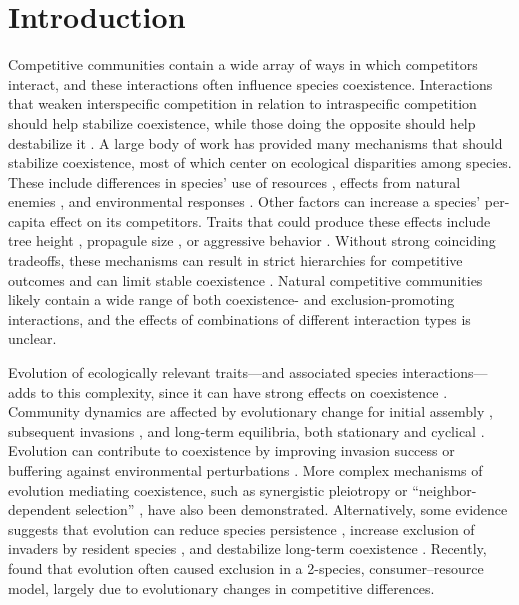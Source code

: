 
\section*{Introduction}

Competitive communities contain a wide array of ways in which
competitors interact, and these interactions often influence
species coexistence.
Interactions that weaken interspecific competition in relation to
intraspecific competition should help stabilize coexistence,
while those doing the opposite should help destabilize it 
\citep{Chesson2000}.
A large body of work has provided many mechanisms that should stabilize
coexistence, most of which center on ecological disparities among species.
These include differences in species'
use of resources \citep{Macarthur1967a,Roughgarden1976,Abrams2009}, 
effects from natural enemies \citep{Grover1998,Vandermeer1998,Ehrlich2017a,Abrams2002},
and environmental responses
\citep{Chesson1997,Armstrong1976,Loreau1992,Chesson1994,Kremer2017,Pacala1994}.
Other factors can increase a species' per-capita effect on its competitors.
Traits that could produce these effects include
tree height \citep{Falster2003}, 
propagule size \citep{Geritz1999,Fagerstrdm2016},
or aggressive behavior \citep{Brown1971}.
Without strong coinciding tradeoffs, these mechanisms can result 
in strict hierarchies for competitive outcomes and 
can limit stable coexistence \citep{Abrams1994,Falster2003}.
Natural competitive communities likely contain a wide range of
both coexistence- and exclusion-promoting interactions,
and the effects of combinations of different interaction types
is unclear.


Evolution of ecologically relevant traits---and 
associated species interactions---adds to this complexity,
since it can have strong effects on coexistence
\citep{Wagner2017a,TerHorst2018}.
Community dynamics are affected by evolutionary change
for initial assembly \citep{Vellend2010},
subsequent invasions \citep{Faillace2016},
and long-term equilibria, both
stationary \citep{Lankau2011,Barabas2016}
and cyclical \citep{Fussmann2013,Vasseur2011a,Kremer2017}.
Evolution can contribute to coexistence by
improving invasion success \citep{Faillace2016}
or buffering against environmental perturbations 
\citep{Barabas2016,Fussmann2013,Osmond2013,Bell2017}.
More complex mechanisms of evolution mediating coexistence, 
such as synergistic pleiotropy \citep{Schreiber2018a}
or ``neighbor-dependent selection'' \citep{Vasseur2011a},
have also been demonstrated.
Alternatively, some evidence suggests that evolution can 
reduce species persistence \citep{Ferriere2013},
increase exclusion of invaders by resident species \citep{Faillace2016},
and destabilize long-term coexistence \citep{Shoresh2008}.
Recently, \citet{Pastore2021} found that evolution often caused
exclusion in a 2-species, consumer--resource model, 
largely due to evolutionary changes in competitive differences.


